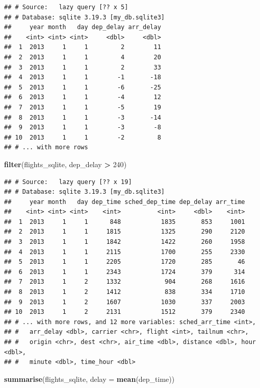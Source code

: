 \documentclass[]{book}
\newenvironment{Shaded}{\begin{snugshade}}{\end{snugshade}}
\newcommand{\KeywordTok}[1]{\textcolor[rgb]{0.13,0.29,0.53}{\textbf{#1}}}
\newcommand{\DataTypeTok}[1]{\textcolor[rgb]{0.13,0.29,0.53}{#1}}
\newcommand{\DecValTok}[1]{\textcolor[rgb]{0.00,0.00,0.81}{#1}}
\newcommand{\StringTok}[1]{\textcolor[rgb]{0.31,0.60,0.02}{#1}}
\newcommand{\OperatorTok}[1]{\textcolor[rgb]{0.81,0.36,0.00}{\textbf{#1}}}
\newcommand{\NormalTok}[1]{#1}
\theoremstyle{definition}
\theoremstyle{definition}
\theoremstyle{definition}
\theoremstyle{remark}
\begin{document}
\begin{verbatim}
## # Source:   lazy query [?? x 5]
## # Database: sqlite 3.19.3 [my_db.sqlite3]
##     year month   day dep_delay arr_delay
##    <int> <int> <int>     <dbl>     <dbl>
##  1  2013     1     1         2        11
##  2  2013     1     1         4        20
##  3  2013     1     1         2        33
##  4  2013     1     1        -1       -18
##  5  2013     1     1        -6       -25
##  6  2013     1     1        -4        12
##  7  2013     1     1        -5        19
##  8  2013     1     1        -3       -14
##  9  2013     1     1        -3        -8
## 10  2013     1     1        -2         8
## # ... with more rows
\end{verbatim}

\begin{Shaded}
\begin{Highlighting}[]
\KeywordTok{filter}\NormalTok{(flights_sqlite, dep_delay }\OperatorTok{>}\StringTok{ }\DecValTok{240}\NormalTok{)}
\end{Highlighting}
\end{Shaded}

\begin{verbatim}
## # Source:   lazy query [?? x 19]
## # Database: sqlite 3.19.3 [my_db.sqlite3]
##     year month   day dep_time sched_dep_time dep_delay arr_time
##    <int> <int> <int>    <int>          <int>     <dbl>    <int>
##  1  2013     1     1      848           1835       853     1001
##  2  2013     1     1     1815           1325       290     2120
##  3  2013     1     1     1842           1422       260     1958
##  4  2013     1     1     2115           1700       255     2330
##  5  2013     1     1     2205           1720       285       46
##  6  2013     1     1     2343           1724       379      314
##  7  2013     1     2     1332            904       268     1616
##  8  2013     1     2     1412            838       334     1710
##  9  2013     1     2     1607           1030       337     2003
## 10  2013     1     2     2131           1512       379     2340
## # ... with more rows, and 12 more variables: sched_arr_time <int>,
## #   arr_delay <dbl>, carrier <chr>, flight <int>, tailnum <chr>,
## #   origin <chr>, dest <chr>, air_time <dbl>, distance <dbl>, hour <dbl>,
## #   minute <dbl>, time_hour <dbl>
\end{verbatim}

\begin{Shaded}
\begin{Highlighting}[]
\KeywordTok{summarise}\NormalTok{(flights_sqlite, }\DataTypeTok{delay =} \KeywordTok{mean}\NormalTok{(dep_time))}
\end{Highlighting}
\end{Shaded}
\end{document}
